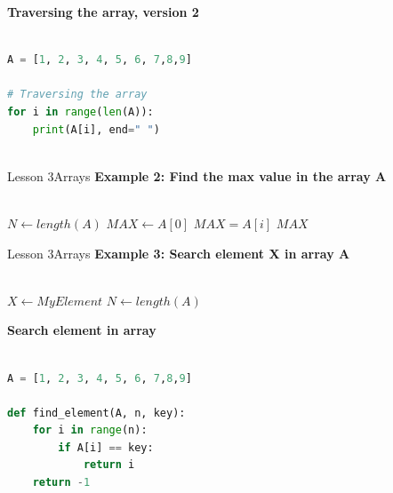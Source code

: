 \documentclass[aspectratio=1610]{beamer}
\begin{document}
\begin{frame}[fragile]
\LARGE
\textbf{Traversing the array, version 2}\\~\\
\Large
\begin{lstlisting}[language=Python]
A = [1, 2, 3, 4, 5, 6, 7,8,9]

# Traversing the array
for i in range(len(A)):
    print(A[i], end=" ")
    
\end{lstlisting}
\end{frame}


\begin{frame}{Lesson 3}{Arrays}
\Large
\textbf{Example 2: Find the max value in the array A}\\~\\

\label{MaxArray}
\begin{algorithmic}[1]
 
\State $N\gets length(A)$
\State $MAX\gets A[0]$
    \State \textbf{$MAX = A[i]$} 
\EndIf
\EndFor
\State \Return $MAX$
\EndProcedure
\end{algorithmic}
\end{frame}



\begin{frame}{Lesson 3}{Arrays}
\Large
\textbf{Example 3: Search element X in array A}\\~\\
\label{SearchArray}
\begin{algorithmic}[1]
 
\State $X\gets MyElement$
\State $N\gets length(A)$
    \State {}  
\EndIf
\EndFor
\State {} 
\EndProcedure
\end{algorithmic}
\end{frame}



\begin{frame}[fragile]
\LARGE
\textbf{Search element in array}\\~\\
\Large
\begin{lstlisting}[language=Python]
A = [1, 2, 3, 4, 5, 6, 7,8,9]

def find_element(A, n, key):
    for i in range(n):
        if A[i] == key:
            return i
    return -1

\end{lstlisting}
\end{frame}
\end{document}
